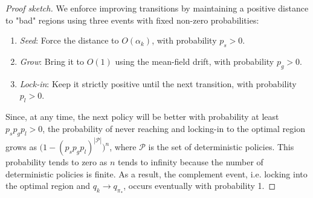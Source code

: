 \documentclass{article}
\begin{document}
\begin{proof}[Proof sketch]
We enforce improving transitions by maintaining a positive distance to "bad" regions using three events with fixed non-zero probabilities:
\begin{enumerate}
\item \emph{Seed}: Force the distance to $O(\alpha_k)$, with probability $p_s>0$.
\item \emph{Grow}: Bring it to $O(1)$ using the mean-field drift, with probability $p_g>0$.
\item \emph{Lock-in}: Keep it strictly positive until the next transition, with probability $p_l>0$.
\end{enumerate}
Since, at any time, the next policy will be better with probability at least $p_s p_g p_l > 0$,
the probability of never reaching and locking-in to the optimal region grows as $\big(1 - (p_s p_g p_l)^{|\mathcal P|} \big)^n$, where $\mathcal P$ is the set of deterministic policies.
This probability tends to zero as $n$ tends to infinity because the number of deterministic policies is finite.
As a result, the complement event, i.e. locking into the optimal region and $q_k \to q_{\pi_*}$, occurs eventually with probability 1.
\end{proof}



\end{document}

